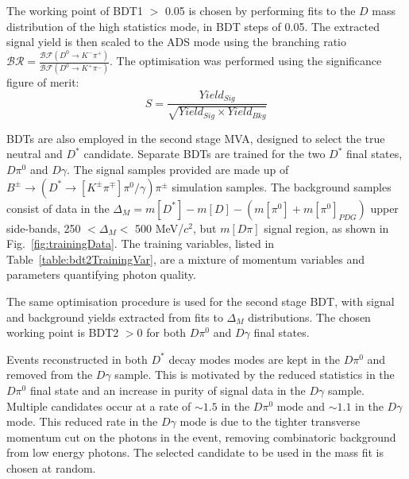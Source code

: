 \documentclass[oneside,12pt]{article}
\begin{document}
The working point of BDT1 $>$ 0.05 is chosen by performing fits to the $D$ mass
distribution of the high statistics mode, in BDT steps of 0.05. The extracted
signal yield is then scaled to the ADS mode using the branching ratio
$\mathcal{BR} = \frac{\mathcal{BF}(D^0 \rightarrow K^- \pi^+)}{\mathcal{BF}(D^0
\rightarrow K^+ \pi^-)}$. The optimisation was performed using the
significance figure of merit:
\begin{equation}
S = \frac{Yield_{Sig}}{\sqrt{Yield_{Sig} \times Yield_{Bkg}}}
\label{D_branching_ratio}
\end{equation}

BDTs are also employed in the second stage MVA, designed to select the true
neutral and $D^*$ candidate. Separate BDTs are trained for the two $D^*$ final
states, $D\pi^0$ and $D\gamma$. The signal samples provided are made up of
$B^{\pm}\rightarrow (D^*\rightarrow [K^{\pm}\pi^{\mp}]\pi^0/\gamma)\pi^{\pm}$
simulation samples. The background samples consist of data in the
$\Delta_M=m[D^{*}] - m[D]- (m[\pi^0] + m[\pi^0]_{PDG})$ upper side-bands, 250 $
< \Delta_{M} < $ 500 MeV/$c^2$, but $m[D\pi]$ signal region, as shown in
Fig.~\ref{fig:trainingData}. The training variables, listed in
Table~\ref{table:bdt2TrainingVar}, are a mixture of momentum variables and
parameters quantifying photon quality. 

The same optimisation procedure is used for the second stage BDT, with
signal and background yields extracted from fits to $\Delta_M$
distributions. The chosen working point is BDT2 $>0$ for both $D\pi^0$ and
$D\gamma$ final states.

Events reconstructed in both $D^{*}$ decay modes modes are kept in the $D\pi^0$
and removed from the $D\gamma$ sample. This is motivated by the reduced
statistics in the $D\pi^0$ final state and an increase in purity of signal data
in the $D\gamma$ sample. Multiple candidates occur at a rate of $\sim 1.5$ in
the $D\pi^0$ mode and $\sim 1.1$ in the $D\gamma$ mode. This reduced rate in the
$D\gamma$ mode is due to the tighter transverse momentum cut on the photons in
the event, removing combinatoric background from low energy photons. The
selected candidate to be used in the mass fit is chosen at random.
\end{document}
